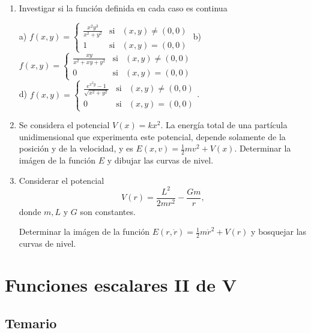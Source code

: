 \documentclass[11pt]{book}
\theoremstyle{definicion}
\theoremstyle{teorema}
\theoremstyle{ejemplo}
\begin{document}
\begin{enumerate}
j) $\underset{\left( x,y\right) \rightarrow \left( 0,0\right) }{\lim }\frac{%
\ln \left( 1+x+y^{{}}\right) }{x+y}$

\medskip
\item Investigar si la función definida en cada caso es continua

a) $f(x,y)=\left\{ 
\begin{array}{ccc}
\frac{x^{2}y^{3}}{x^{2}+y^{2}} & \text{si} & (x,y)\neq \left( 0,0\right)  \\ 
1 & \text{si} & \left( x,y\right) =\left( 0,0\right) 
\end{array}%
\right. 
 $ b) $f(x,y)=\left\{ 
\begin{array}{ccc}
\frac{xy}{x^{2}+xy+y^{2}} & \text{si} & (x,y)\neq \left( 0,0\right)  \\ 
0 & \text{si} & \left( x,y\right) =\left( 0,0\right) 
\end{array}%
\right. $ \\d) $f(x,y)=\left\{ 
\begin{array}{ccc}
\frac{e^{x^{2}y}-1}{\sqrt{x^{2}+y^{2}}} & \text{si} & (x,y)\neq \left(
0,0\right)  \\ 
0 & \text{si} & \left( x,y\right) =\left( 0,0\right) 
\end{array}%
\right. $.




\item Se considera el potencial $V(x) = kx^2$. La energ\'ia total de una part\'icula unidimensional que experimenta este potencial, depende solamente de la posici\'on y de la velocidad, y es $E(x,v) = \frac{1}{2}m v^2 + V(x)$. Determinar la im\'agen de la funci\'on $E$ y dibujar las curvas de nivel.



\item  Considerar el potencial 
$$V(r) = \frac{L^2}{2mr^2} - \frac{Gm}{r},$$
donde $m,L$ y $G$ son constantes.

Determinar la im\'agen de la funci\'on $E(r,\dot{r}) = \frac{1}{2}m\dot{r}^2 + V(r)$ y bosquejar las curvas de nivel.




\end{enumerate}

\chapter{Funciones escalares II de V}

\section{Temario}
\end{document}
